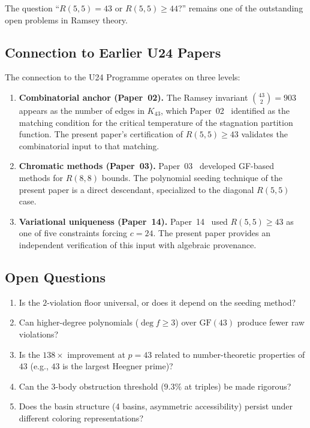 \documentclass[12pt,a4paper]{article}
\theoremstyle{definition}
\theoremstyle{remark}
\newcommand{\GF}[1]{\mathrm{GF}(#1)}
\newcommand{\Kn}[1]{K_{#1}}
\newcommand{\Rnum}[2]{R(#1,#2)}
\begin{document}
The question ``$\Rnum{5}{5} = 43$ or $\Rnum{5}{5} \ge 44$?'' remains one of the outstanding open problems in Ramsey theory.

\subsection{Connection to Earlier U24 Papers}

The connection to the U24 Programme operates on three levels:

\begin{enumerate}[nosep]
    \item \textbf{Combinatorial anchor (Paper~02).}  The Ramsey invariant $\binom{43}{2} = 903$ appears as the number of edges in $\Kn{43}$, which Paper~02~\cite{dwr02} identified as the matching condition for the critical temperature of the stagnation partition function.  The present paper's certification of $\Rnum{5}{5} \ge 43$ validates the combinatorial input to that matching.

    \item \textbf{Chromatic methods (Paper~03).}  Paper~03~\cite{dwr03} developed GF-based methods for $R(8,8)$ bounds.  The polynomial seeding technique of the present paper is a direct descendant, specialized to the diagonal $R(5,5)$ case.

    \item \textbf{Variational uniqueness (Paper~14).}  Paper~14~\cite{dwr14} used $\Rnum{5}{5} \ge 43$ as one of five constraints forcing $c = 24$.  The present paper provides an independent verification of this input with algebraic provenance.
\end{enumerate}

\subsection{Open Questions}

\begin{enumerate}[nosep]
    \item Is the $2$-violation floor universal, or does it depend on the seeding method?
    \item Can higher-degree polynomials ($\deg f \ge 3$) over $\GF{43}$ produce fewer raw violations?
    \item Is the $138\times$ improvement at $p = 43$ related to number-theoretic properties of $43$ (e.g., $43$ is the largest Heegner prime)?
    \item Can the $3$-body obstruction threshold ($9.3\%$ at triples) be made rigorous?
    \item Does the basin structure (4 basins, asymmetric accessibility) persist under different coloring representations?
\end{enumerate}
\end{document}
